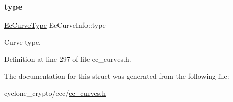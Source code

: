 \mbox{\label{structEcCurveInfo_a66a3a3b5efc82c97fd1f3aaa83d6aed6}} 
\subsubsection{\texorpdfstring{type}{type}}
{\footnotesize\ttfamily \hyperlink{ec__curves_8h_af38fa6633c02444318870a309134ca21}{Ec\+Curve\+Type} Ec\+Curve\+Info\+::type}



Curve type. 



Definition at line 297 of file ec\+\_\+curves.\+h.



The documentation for this struct was generated from the following file\+:\begin{DoxyCompactItemize}
\item 
cyclone\+\_\+crypto/ecc/\hyperlink{ec__curves_8h}{ec\+\_\+curves.\+h}\end{DoxyCompactItemize}

